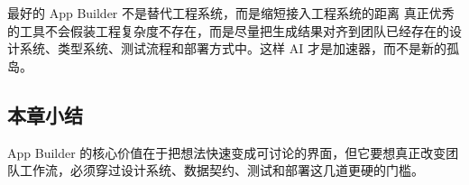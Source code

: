 \begin{knowledgebox}{最好的 App Builder 不是替代工程系统，而是缩短接入工程系统的距离}
真正优秀的工具不会假装工程复杂度不存在，而是尽量把生成结果对齐到团队已经存在的设计系统、类型系统、测试流程和部署方式中。这样 AI 才是加速器，而不是新的孤岛。
\end{knowledgebox}

\subsection{本章小结}

App Builder 的核心价值在于把想法快速变成可讨论的界面，但它要想真正改变团队工作流，必须穿过设计系统、数据契约、测试和部署这几道更硬的门槛。

